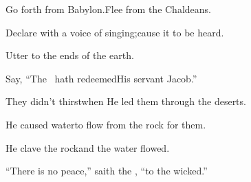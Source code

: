 
\begin{inparaenum}
  \pa{} Go forth from Babylon.\pa{}Flee from the Chaldeans.%

  \pa{}Declare with a voice of singing;\pa{}cause it to be heard.%

  \pa{}Utter to the ends of the earth.%

  \pa{}Say, ``The \lord\ hath redeemed\pa{}His servant Jacob.''%

  \pa{} They didn't thirst\pa{}when He led them through the deserts.%

  \pa{}He caused water\pa{}to flow from the rock for them.%

  \pa{}He clave the rock\pa{}and the water flowed.%

  \pa{} ``There is no peace,'' saith the \lord, ``to the wicked.''%
\end{inparaenum}

